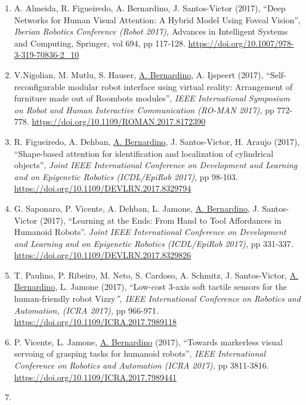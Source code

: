 \documentclass[
]{article}
\begin{document}
\begin{enumerate}
  Augmented Reality Gaming Platform for Active Aging in Elderly
  Institutions'', \emph{International Congress on Sport Sciences
  Research and Technology Support (icSPORTS 2017),} pp 1-12.
  \url{https://doi.org/10.5220/0006606601510162}~
\item
  A. Almeida, R. Figueiredo, A. Bernardino, J. Santos-Victor (2017),
  ``Deep Networks for Human Visual Attention: A Hybrid Model Using
  Foveal Vision'', \emph{Iberian Robotics Conference (Robot 2017),}
  Advances in Intelligent Systems and Computing, Springer, vol 694, pp
  117-128. \url{https://doi.org/10.1007/978-3-319-70836-2_10}~
\item
  V.Nigolian, M. Mutlu, S. Hauser, \ul{A. Bernardino}, A. Ijspeert
  (2017), ``Self-reconfigurable modular robot interface using virtual
  reality: Arrangement of furniture made out of Roombots modules'',
  \emph{IEEE International Symposium on Robot and Human Interactive
  Communication (RO-MAN 2017),} pp 772-778.
  \url{https://doi.org/10.1109/ROMAN.2017.8172390}~~
\item
  R. Figueiredo, A. Dehban, \ul{A. Bernardino}, J. Santos-Victor, H.
  Araujo (2017), ``Shape-based attention for identification and
  localization of cylindrical objects'', \emph{Joint IEEE International
  Conference on Development and Learning and on Epigenetic Robotics
  (ICDL/EpiRob 2017)}, pp 98-103.
  \url{https://doi.org/10.1109/DEVLRN.2017.8329794}~
\item
  G. Saponaro, P. Vicente, A. Dehban, L. Jamone, \ul{A. Bernardino}, J.
  Santos-Victor (2017), ``Learning at the Ends: From Hand to Tool
  Affordances in Humanoid Robots''. \emph{Joint IEEE International
  Conference on Development and Learning and on Epigenetic Robotics
  (ICDL/EpiRob 2017),} pp 331-337\emph{.}
  \url{https://doi.org/10.1109/DEVLRN.2017.8329826}~
\item
  T. Paulino, P. Ribeiro, M. Neto, S. Cardoso, A. Schmitz, J.
  Santos-Victor, \ul{A. Bernardino}, L. Jamone (2017), ``Low-cost 3-axis
  soft tactile sensors for the human-friendly robot Vizzy\emph{'', IEEE
  International Conference on Robotics and Automation, (ICRA 2017),} pp
  966-971\emph{.} \url{https://doi.org/10.1109/ICRA.2017.7989118}~
\item
  P. Vicente, L. Jamone, \ul{A. Bernardino} (2017), ``Towards markerless
  visual servoing of grasping tasks for humanoid robots'', \emph{IEEE
  International Conference on Robotics and Automation (ICRA 2017),} pp
  3811-3816\emph{.} \url{https://doi.org/10.1109/ICRA.2017.7989441}~
\item

\end{enumerate}
\end{document}
